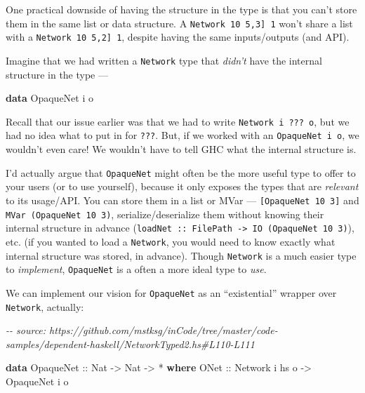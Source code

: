 \documentclass[]{article}
\newenvironment{Shaded}{}{}
\newcommand{\CommentTok}[1]{\textcolor[rgb]{0.38,0.63,0.69}{\textit{#1}}}
\newcommand{\DataTypeTok}[1]{\textcolor[rgb]{0.56,0.13,0.00}{#1}}
\newcommand{\KeywordTok}[1]{\textcolor[rgb]{0.00,0.44,0.13}{\textbf{#1}}}
\newcommand{\NormalTok}[1]{#1}
\newcommand{\OperatorTok}[1]{\textcolor[rgb]{0.40,0.40,0.40}{#1}}
\newcommand{\OtherTok}[1]{\textcolor[rgb]{0.00,0.44,0.13}{#1}}
\begin{document}
One practical downside of having the structure in the type is that you can't
store them in the same list or data structure. A
\texttt{Network\ 10\ \textquotesingle{}{[}5,3{]}\ 1} won't share a list with a
\texttt{Network\ 10\ \textquotesingle{}{[}5,2{]}\ 1}, despite having the same
inputs/outputs (and API).

Imagine that we had written a \texttt{Network} type that \emph{didn't} have the
internal structure in the type ---

\begin{Shaded}
\begin{Highlighting}[]
\KeywordTok{data} \DataTypeTok{OpaqueNet}\NormalTok{ i o}
\end{Highlighting}
\end{Shaded}

Recall that our issue earlier was that we had to write
\texttt{Network\ i\ ???\ o}, but we had no idea what to put in for \texttt{???}.
But, if we worked with an \texttt{OpaqueNet\ i\ o}, we wouldn't even care! We
wouldn't have to tell GHC what the internal structure is.

I'd actually argue that \texttt{OpaqueNet} might often be the more useful type
to offer to your users (or to use yourself), because it only exposes the types
that are \emph{relevant} to its usage/API. You can store them in a list or MVar
--- \texttt{{[}OpaqueNet\ 10\ 3{]}} and \texttt{MVar\ (OpaqueNet\ 10\ 3)},
serialize/deserialize them without knowing their internal structure in advance
(\texttt{loadNet\ ::\ FilePath\ -\textgreater{}\ IO\ (OpaqueNet\ 10\ 3)}), etc.
(if you wanted to load a \texttt{Network}, you would need to know exactly what
internal structure was stored, in advance). Though \texttt{Network} is a much
easier type to \emph{implement}, \texttt{OpaqueNet} is a often a more ideal type
to \emph{use}.

We can implement our vision for \texttt{OpaqueNet} as an ``existential'' wrapper
over \texttt{Network}, actually:

\begin{Shaded}
\begin{Highlighting}[]
\CommentTok{{-}{-} source: https://github.com/mstksg/inCode/tree/master/code{-}samples/dependent{-}haskell/NetworkTyped2.hs\#L110{-}L111}

\KeywordTok{data} \DataTypeTok{OpaqueNet}\OtherTok{ ::} \DataTypeTok{Nat} \OtherTok{{-}\textgreater{}} \DataTypeTok{Nat} \OtherTok{{-}\textgreater{}} \OperatorTok{*} \KeywordTok{where}
    \DataTypeTok{ONet}\OtherTok{ ::} \DataTypeTok{Network}\NormalTok{ i hs o }\OtherTok{{-}\textgreater{}} \DataTypeTok{OpaqueNet}\NormalTok{ i o}
\end{Highlighting}
\end{Shaded}
\end{document}
